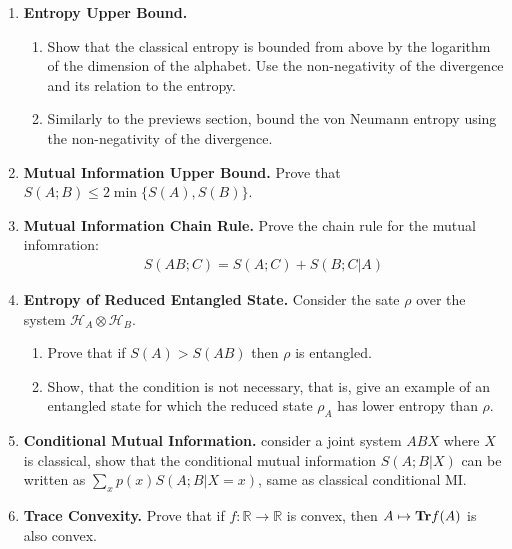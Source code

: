 \documentclass[12pt,a4paper]{article}
\begin{document}
\begin{enumerate}



  \item \textbf{Entropy Upper Bound.}

   \begin{enumerate}
     \item Show that the classical entropy is bounded from above by the logarithm of the dimension of the alphabet. Use the non-negativity of the divergence and its relation to the entropy.


    \item Similarly to the previews section, bound the von Neumann entropy using the non-negativity of the divergence.


  \end{enumerate}

  \item \textbf{Mutual Information Upper Bound.} 
     Prove that $S(A;B) \le 2\min \{S(A), S(B) \}$.




  \item \textbf{Mutual Information Chain Rule.} Prove the chain rule for the mutual infomration:
    \begin{equation*}
      \begin{split}
        S(AB;C) = S(A;C) + S(B;C|A) 
      \end{split}
    \end{equation*}


  \item \textbf{Entropy of Reduced Entangled State.} Consider the sate $\rho$ over the system $\mathcal{H}_{A} \otimes \mathcal{H}_{B}$.
    \begin{enumerate}
      \item Prove that if $S(A) > S(AB)$ then $\rho$ is entangled.   


      \item  Show, that the condition is not necessary, that is, give an example of an entangled state for which the reduced state $\rho_A$ has lower entropy than $\rho$. 


    \end{enumerate}


  \item \textbf{Conditional Mutual Information.} consider a joint system $ABX$ where $X$ is classical, show that the conditional mutual information $S(A;B|X)$ can be written as $\sum_x {p(x) S(A;B|X=x)}$, same as classical conditional MI.

    

  \item \textbf{Trace Convexity.} Prove that if $f : \mathbb{R} \rightarrow \mathbb{R}$ is convex, then $A \mapsto \mathbf{Tr} f(A)$ is also convex.

\end{enumerate}
\end{document}
